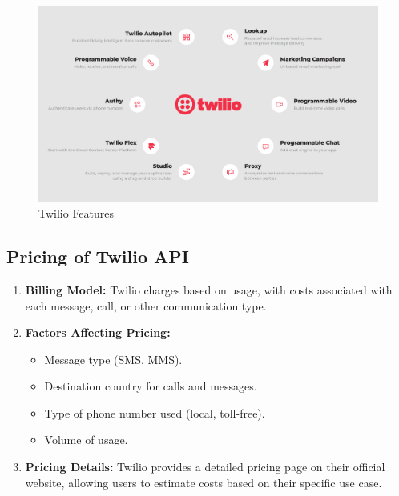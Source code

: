 \documentclass[11pt]{article}
\begin{document}
\begin{figure}[H]
    \centering
    \includegraphics[width=.95\textwidth]{twilio/twilio_6.jpg}
    \caption{Twilio Features}
\end{figure}

\subsection{Pricing of Twilio API}
\begin{enumerate}
    \item \textbf{Billing Model:} Twilio charges based on usage, with costs associated with each message, call, or other communication type.

    \item \textbf{Factors Affecting Pricing:}
          \begin{itemize}
              \item Message type (SMS, MMS).
              \item Destination country for calls and messages.
              \item Type of phone number used (local, toll-free).
              \item Volume of usage.
          \end{itemize}

    \item \textbf{Pricing Details:} Twilio provides a detailed pricing page on their official website, allowing users to estimate costs based on their specific use case.

\end{enumerate}
\end{document}
